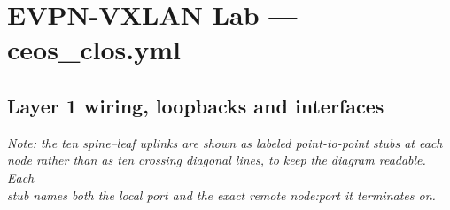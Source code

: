\documentclass[11pt]{article}
\begin{document}
\section*{EVPN-VXLAN Lab --- ceos\_clos.yml}
\subsection*{Layer 1 wiring, loopbacks and interfaces}

{\small
\textit{Note: the ten spine--leaf uplinks are shown as labeled point-to-point stubs at each}\\
\textit{node rather than as ten crossing diagonal lines, to keep the diagram readable. Each}\\
\textit{stub names both the local port and the exact remote node:port it terminates on.}
}
\end{document}
